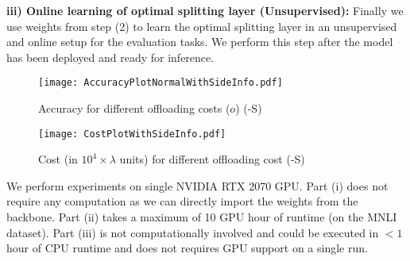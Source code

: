\textbf{iii) Online learning of optimal splitting layer (Unsupervised):} Finally we use weights from step (2) to learn the optimal splitting layer in an unsupervised and online setup for the evaluation tasks. We perform this step after the model has been deployed and ready for inference.

\begin{figure*}
    \centering \texttt{[image: AccuracyPlotNormalWithSideInfo.pdf]}
    \caption{Accuracy for different offloading costs ($o$) (\our{}-S)}
    \label{fig:Accuracy_res_EESPlit s}
\end{figure*}

\begin{figure*}
    \centering \texttt{[image: CostPlotWithSideInfo.pdf]}
    \caption{Cost (in $10^4\times\lambda$ units) for different offloading cost (\our{}-S)}
    \label{fig:cost_res_EESPLIT-S}
\end{figure*} 

We perform experiments on single NVIDIA RTX 2070 GPU. Part (i) does not require any computation as we can directly import the weights from the backbone. Part (ii) takes a maximum of 10 GPU hour of runtime (on the MNLI dataset). Part (iii) is not computationally involved and could be executed in $<1$ hour of CPU runtime and does not requires GPU support on a single run.

